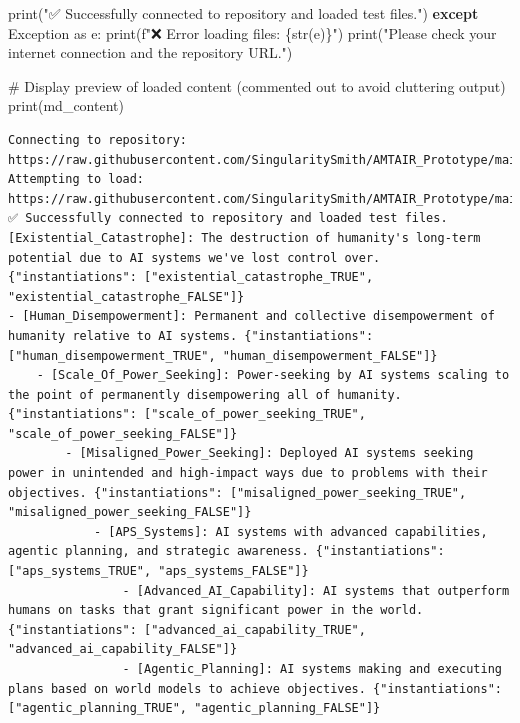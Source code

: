 \documentclass[
  11pt,
  letterpaper,
]{book}
\newenvironment{Shaded}{\begin{snugshade}}{\end{snugshade}}
\newcommand{\BuiltInTok}[1]{\textcolor[rgb]{0.00,0.23,0.31}{#1}}
\newcommand{\CommentTok}[1]{\textcolor[rgb]{0.37,0.37,0.37}{#1}}
\newcommand{\ControlFlowTok}[1]{\textcolor[rgb]{0.00,0.23,0.31}{\textbf{#1}}}
\newcommand{\ImportTok}[1]{\textcolor[rgb]{0.00,0.46,0.62}{#1}}
\newcommand{\NormalTok}[1]{\textcolor[rgb]{0.00,0.23,0.31}{#1}}
\newcommand{\PreprocessorTok}[1]{\textcolor[rgb]{0.68,0.00,0.00}{#1}}
\newcommand{\SpecialCharTok}[1]{\textcolor[rgb]{0.37,0.37,0.37}{#1}}
\newcommand{\SpecialStringTok}[1]{\textcolor[rgb]{0.13,0.47,0.30}{#1}}
\newcommand{\StringTok}[1]{\textcolor[rgb]{0.13,0.47,0.30}{#1}}
\begin{document}
\begin{Shaded}
\begin{Highlighting}[]
    \BuiltInTok{print}\NormalTok{(}\StringTok{"✅ Successfully connected to repository and loaded test files."}\NormalTok{)}
\ControlFlowTok{except} \PreprocessorTok{Exception} \ImportTok{as}\NormalTok{ e:}
    \BuiltInTok{print}\NormalTok{(}\SpecialStringTok{f"❌ Error loading files: }\SpecialCharTok{\{}\BuiltInTok{str}\NormalTok{(e)}\SpecialCharTok{\}}\SpecialStringTok{"}\NormalTok{)}
    \BuiltInTok{print}\NormalTok{(}\StringTok{"Please check your internet connection and the repository URL."}\NormalTok{)}

\CommentTok{\# Display preview of loaded content (commented out to avoid cluttering output)}
\BuiltInTok{print}\NormalTok{(md\_content)}
\end{Highlighting}
\end{Shaded}

\begin{verbatim}
Connecting to repository: https://raw.githubusercontent.com/SingularitySmith/AMTAIR_Prototype/main/data/example_carlsmith/
Attempting to load: https://raw.githubusercontent.com/SingularitySmith/AMTAIR_Prototype/main/data/example_carlsmith/ArgDown.md
✅ Successfully connected to repository and loaded test files.
[Existential_Catastrophe]: The destruction of humanity's long-term potential due to AI systems we've lost control over. {"instantiations": ["existential_catastrophe_TRUE", "existential_catastrophe_FALSE"]}
- [Human_Disempowerment]: Permanent and collective disempowerment of humanity relative to AI systems. {"instantiations": ["human_disempowerment_TRUE", "human_disempowerment_FALSE"]}
    - [Scale_Of_Power_Seeking]: Power-seeking by AI systems scaling to the point of permanently disempowering all of humanity. {"instantiations": ["scale_of_power_seeking_TRUE", "scale_of_power_seeking_FALSE"]}
        - [Misaligned_Power_Seeking]: Deployed AI systems seeking power in unintended and high-impact ways due to problems with their objectives. {"instantiations": ["misaligned_power_seeking_TRUE", "misaligned_power_seeking_FALSE"]}
            - [APS_Systems]: AI systems with advanced capabilities, agentic planning, and strategic awareness. {"instantiations": ["aps_systems_TRUE", "aps_systems_FALSE"]}
                - [Advanced_AI_Capability]: AI systems that outperform humans on tasks that grant significant power in the world. {"instantiations": ["advanced_ai_capability_TRUE", "advanced_ai_capability_FALSE"]}
                - [Agentic_Planning]: AI systems making and executing plans based on world models to achieve objectives. {"instantiations": ["agentic_planning_TRUE", "agentic_planning_FALSE"]}

\end{verbatim}
\end{document}
